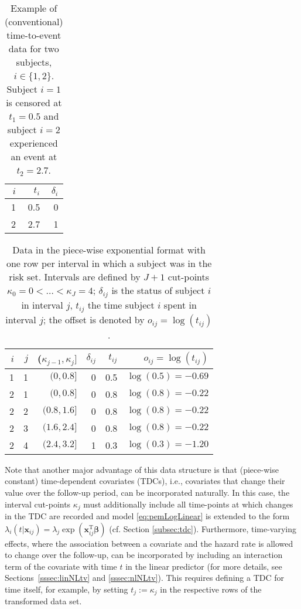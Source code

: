 \documentclass[submit]{smj}
\newcommand{\bfx}{\mathbf{x}}
\newcommand{\bsbeta}{\boldsymbol{\beta}}
\def\T{{ \mathrm{\scriptscriptstyle T} }}
\begin{document}
\begin{table}[!b]
\begin{center}

\caption{Example of (conventional) time-to-event data for two subjects, $i\in \{1,2\}$.
Subject $i=1$ is censored at $t_1=0.5$ and subject $i=2$ experienced an event at
$t_2=2.7$.}
\vspace{15pt}
\label{tab:exampleData}
\begin{tabular}{r|r|r}
$i$ & $t_i$ & $\delta_i$\\
\hline
1 & 0.5   & 0\\
2 & 2.7   & 1 \\
\hline
\end{tabular}
\end{center}
\end{table}

\begin{table}%
\begin{center}
\caption{Data in the piece-wise exponential format with one row per interval
in which a subject was in the risk set. Intervals are defined by $J+1$ cut-points
$\kappa_0=0 < \ldots < \kappa_J=4$; $\delta_{ij}$ is the status of subject
$i$ in interval $j$, $t_{ij}$ the time subject $i$ spent in interval $j$;
the offset is denoted by $o_{ij}=\log(t_{ij})$.}
\label{tab:example:PED}
\vspace{15pt}
\begin{tabular}{r|r|r|r|r|r}
$i$ & $j$ & ($\kappa_{j-1}, \kappa_{j}]$ & $\delta_{ij}$ & $t_{ij}$ & $o_{ij}=\log(t_{ij})$\\
     \hline
1 & 1 & $(0, 0.8]$    & 0 & 0.5 & $\log(0.5)=-0.69$  \\
2 & 1 & $(0, 0.8]$    & 0 & 0.8 & $\log(0.8)=-0.22$  \\
2 & 2 & $(0.8, 1.6]$  & 0 & 0.8 & $\log(0.8)=-0.22$  \\
2 & 3 & $(1.6, 2.4] $ & 0 & 0.8 & $\log(0.8)=-0.22$  \\
2 & 4 & $(2.4, 3.2] $ & 1 & 0.3 & $\log(0.3)=-1.20$  \\
\hline
\end{tabular}
\end{center}
\end{table}

Note that another major advantage of this data structure is that
(piece-wise constant) time-dependent covariates (TDCs), i.e., covariates that
change their value over the follow-up period, can be incorporated naturally.
In this case, the interval cut-points $\kappa_j$ must additionally include all
time-points at which changes in the TDC are recorded and model
\eqref{eq:pemLogLinear} is extended to the form
$\lambda_i(t|\bfx_{ij})=\lambda_{j}\exp(\bfx_{ij}^{\T}\bsbeta)$
(cf. Section \ref{subsec:tdc}).
Furthermore, time-varying effects, where the association between a covariate and the hazard rate is allowed to change over the follow-up, can be incorporated by
including an interaction term of the covariate with time $t$
in the linear predictor (for more details, see Sections~\ref{sssec:linNLtv} and
 \ref{sssec:nlNLtv}). This requires defining a TDC for
time itself, for example, by setting $t_j := \kappa_j$ in the respective rows of the transformed data set.
\end{document}
